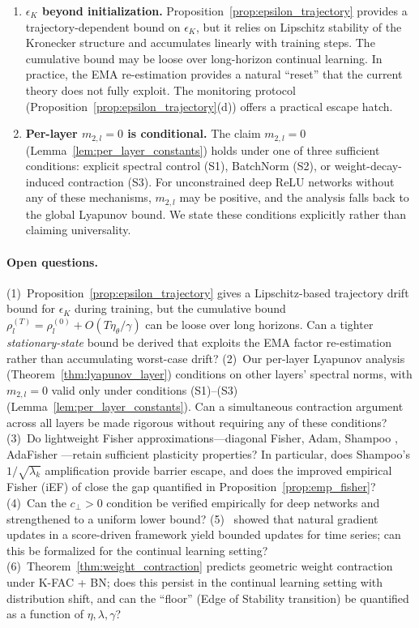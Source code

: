 \documentclass{article}
\theoremstyle{plain}
\theoremstyle{definition}
\theoremstyle{remark}
\begin{document}
\begin{enumerate}
\item \textbf{$\epsilon_K$ beyond initialization.} Proposition~\ref{prop:epsilon_trajectory} provides a trajectory-dependent bound on $\epsilon_K$, but it relies on Lipschitz stability of the Kronecker structure and accumulates linearly with training steps. The cumulative bound may be loose over long-horizon continual learning. In practice, the EMA re-estimation provides a natural ``reset'' that the current theory does not fully exploit. The monitoring protocol (Proposition~\ref{prop:epsilon_trajectory}(d)) offers a practical escape hatch.

\item \textbf{Per-layer $m_{2,l} = 0$ is conditional.} The claim $m_{2,l} = 0$ (Lemma~\ref{lem:per_layer_constants}) holds under one of three sufficient conditions: explicit spectral control (S1), BatchNorm (S2), or weight-decay-induced contraction (S3). For unconstrained deep ReLU networks without any of these mechanisms, $m_{2,l}$ may be positive, and the analysis falls back to the global Lyapunov bound. We state these conditions explicitly rather than claiming universality.
\end{enumerate}

\paragraph{Open questions.}
(1)~Proposition~\ref{prop:epsilon_trajectory} gives a Lipschitz-based trajectory drift bound for $\epsilon_K$ during training, but the cumulative bound $\rho_l^{(T)} = \rho_l^{(0)} + O(T\eta_\theta/\gamma)$ can be loose over long horizons. Can a tighter \emph{stationary-state} bound be derived that exploits the EMA factor re-estimation rather than accumulating worst-case drift? (2)~Our per-layer Lyapunov analysis (Theorem~\ref{thm:lyapunov_layer}) conditions on other layers' spectral norms, with $m_{2,l} = 0$ valid only under conditions (S1)--(S3) (Lemma~\ref{lem:per_layer_constants}). Can a simultaneous contraction argument across all layers be made rigorous without requiring any of these conditions? (3)~Do lightweight Fisher approximations---diagonal Fisher, Adam, Shampoo \citep{gupta2018shampoo, morwani2025shampoo}, AdaFisher \citep{adafisher2025}---retain sufficient plasticity properties? In particular, does Shampoo's $1/\sqrt{\lambda_k}$ amplification provide barrier escape, and does the improved empirical Fisher (iEF) of \citet{george2018fast} close the gap quantified in Proposition~\ref{prop:emp_fisher}? (4)~Can the $c_\perp > 0$ condition be verified empirically for deep networks and strengthened to a uniform lower bound? (5)~\citet{urettini2026natsr} showed that natural gradient updates in a score-driven framework yield bounded updates for time series; can this be formalized for the continual learning setting? (6)~Theorem~\ref{thm:weight_contraction} predicts geometric weight contraction under K-FAC + BN; does this persist in the continual learning setting with distribution shift, and can the ``floor'' (Edge of Stability transition) be quantified as a function of $\eta, \lambda, \gamma$?
\end{document}
